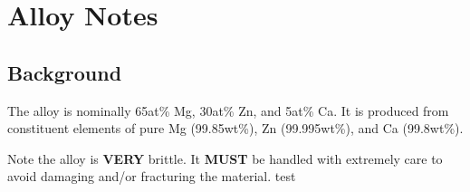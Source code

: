 \section{\MgZnCa Alloy Notes}

\subsection{Background}

The \MgZnCa alloy is nominally 65at\% Mg, 30at\% Zn, and 5at\% Ca. It is produced from constituent elements of pure Mg (99.85wt\%), Zn (99.995wt\%), and Ca (99.8wt\%). 

Note the \MgZnCa alloy is \textbf{VERY} brittle. It \textbf{MUST} be handled with extremely care to avoid damaging and/or fracturing the material. test

